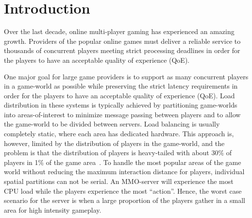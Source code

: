 \section{Introduction}
Over the last decade, online multi-player gaming has experienced an
amazing growth. Providers of the popular online games must deliver a
reliable service to thousands of concurrent players meeting strict
processing deadlines in order for the players to have an acceptable
quality of experience (QoE). 




One major goal for large game providers is to support as many
concurrent players in a game-world as possible while preserving the
strict latency requirements in order for the players to have an
acceptable quality of experience (QoE). Load distribution in these systems is typically achieved by partitioning game-worlds into areas-of-interest to
minimize message passing between players and to
allow the game-world to be divided between servers. Load balancing is usually completely static, where each area has dedicated hardware. This approach is,
however, limited by the distribution of players in the game-world, and
the problem is that the distribution of players is heavy-tailed with
about 30\% of players in 1\% of the game area~\cite{chen-2006}. To
handle the most popular areas of the game world without reducing the
maximum interaction distance for players, individual spatial
partitions can not be serial. An MMO-server will experience the most CPU load while the players experience the most
``action''. Hence, the worst case scenario for the server is when a
large proportion of the players gather in a small area for high
intensity gameplay.

